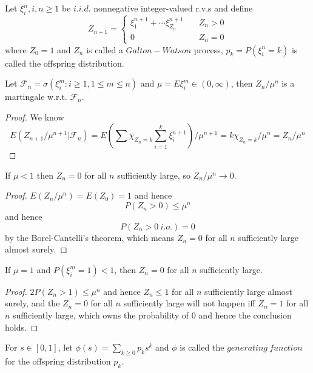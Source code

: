 \documentclass[lang=en, color=blue, ]{elegantbook}
\newcommand{\F}{\mathcal{F}}
\begin{document}
\begin{definition}
    Let $\xi_i^n, i,n\geq 1$ be $i.i.d.$ nonnegative integer-valued r.v.s and define
    \[
    Z_{n+1} = \begin{cases}
    \xi_1^{n+1}+\cdots\xi_{Z_n}^{n+1}\quad&Z_n>0 \\
    0&Z_n=0
    \end{cases}
    \]
    where $Z_0 = 1$ and $Z_n$ is called a $Galton-Watson$ process, $p_k = P(\xi_i^n = k)$ is called the offspring distribution.
\end{definition}

\begin{lemma}
    Let $\F_n = \sigma(\xi_i^m:i\geq 1, 1\leq m \leq n)$ and $\mu = E\xi_i^m \in (0,\infty)$, then $Z_n/\mu^n$ is a martingale w.r.t. $\F_n$.
\end{lemma}
\begin{proof}
    We know
    \[
    E(Z_{n+1}/\mu^{n+1}|\F_n) = E(\sum\chi_{Z_n = k}\sum\limits_{i=1}^k \xi_i^{n+1})/\mu^{n+1} = k\chi_{Z_n = k}/\mu^n = Z_n/\mu^n
    \]
\end{proof}

\begin{theorem}
    If $\mu<1$ then $Z_n = 0$ for all $n$ sufficiently large, so $Z_n/\mu^n \to 0$.
\end{theorem}
\begin{proof}\par
    $E(Z_n/\mu^n) = E(Z_0) = 1$ and hence
    \[
    P(Z_n > 0) \leq \mu^n
    \]
    and hence
    \[P(Z_n > 0\ i.o.) = 0\]
    by the Borel-Cantelli's theorem, which means $Z_n = 0$ for all $n$ sufficiently large almost surely.
\end{proof}

\begin{theorem}
    If $\mu=1$ and $P(\xi_i^m = 1)<1$, then $Z_n = 0$ for all $n$ sufficiently large.
\end{theorem}
\begin{proof}\par
    $2P(Z_n>1) \leq \mu^n$ and hence $Z_n \leq 1$ for all $n$ sufficiently large almost surely, and the $Z_n = 0$ for all $n$ sufficiently large will not happen iff $Z_n = 1$ for all $n$ sufficiently large, which owns the probability of $0$ and hence the conclusion holds.
\end{proof}

\begin{definition}
    For $s\in [0,1]$, let $\phi(s) = \sum_{k\geq 0} p_ks^k$ and $\phi$ is called the $generating\ function$ for the offspring distribution $p_k$.
\end{definition}
\end{document}
